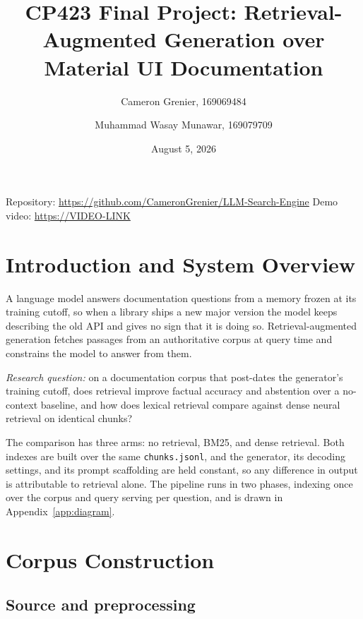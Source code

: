 \documentclass[10pt,a4paper]{article}
\title{\vspace{-2.5em}\large CP423 Final Project: Retrieval-Augmented Generation over Material UI Documentation}
\author{\normalsize Cameron Grenier, 169069484 \and \normalsize Muhammad Wasay Munawar, 169079709}
\date{\small August 5, 2026}
\begin{document}
\maketitle
\vspace{-1.5em}
\begin{center}
\small
Repository: \url{https://github.com/CameronGrenier/LLM-Search-Engine} \quad\textbar\quad
Demo video: \url{https://VIDEO-LINK}
\end{center}

\section{Introduction and System Overview}

A language model answers documentation questions from a memory frozen at its training cutoff, so when a library ships a new major version the model keeps describing the old API and gives no sign that it is doing so. Retrieval-augmented generation fetches passages from an authoritative corpus at query time and constrains the model to answer from them.

\textit{Research question:} on a documentation corpus that post-dates the generator's training cutoff, does retrieval improve factual accuracy and abstention over a no-context baseline, and how does lexical retrieval compare against dense neural retrieval on identical chunks?

The comparison has three arms: no retrieval, BM25, and dense retrieval. Both indexes are built over the same \texttt{chunks.jsonl}, and the generator, its decoding settings, and its prompt scaffolding are held constant, so any difference in output is attributable to retrieval alone. The pipeline runs in two phases, indexing once over the corpus and query serving per question, and is drawn in Appendix~\ref{app:diagram}.

\section{Corpus Construction}

\subsection{Source and preprocessing}
\end{document}
